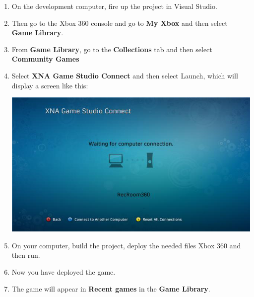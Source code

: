 \begin{enumerate}	
	\item On the development computer, fire up the project in Visual Studio.
	\item Then go to the Xbox 360 console and go to \textbf{My Xbox} and then select \textbf{Game Library}. 
	\item From \textbf{Game Library}, go to the \textbf{Collections} tab and then select \textbf{Community Games}
	\item Select \textbf{XNA Game Studio Connect} and then select Launch, which will display a screen like this: \\ \begin{center}\includegraphics[scale=0.5]{graphics/connect2}\end{center}
	\item On your computer, build the project, deploy the needed files Xbox 360 and then run.
	\item Now you have deployed the game. 
	\item The game will appear in \textbf{Recent games} in the \textbf{Game Library}.	 
\end{enumerate}
